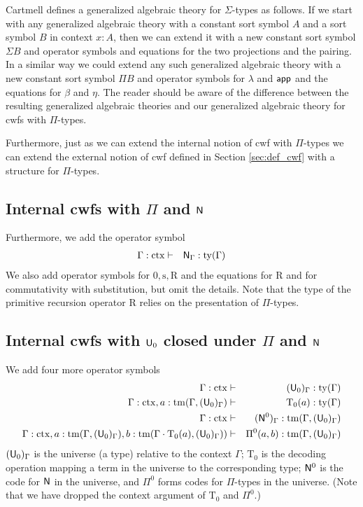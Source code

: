 \documentclass{lmcs}
\newcommand{\FYI}[1]{{\color{red}#1}}
\newcommand{\s}{\mathrm{s}}
\newcommand{\Rec}{\mathrm{R}}
\newcommand{\Ta}{\mathrm{T}}
\newcommand{\ctx}{\mathrm{ctx}}
\newcommand{\ty}{\mathrm{ty}}
\newcommand{\tm}{\mathrm{tm}}
\begin{document}
\begin{remark}
Cartmell \cite{cartmell:apal} defines a generalized algebraic theory for $\Sigma$-types as follows. If we start with any generalized algebraic theory with a constant sort symbol $A$ and  a sort symbol $B$ in context $x:A$, then we can extend it with a new constant sort symbol $\Sigma B$ and operator symbols and equations for the two projections and the pairing. In a similar way we could extend any such generalized algebraic theory with a new constant sort symbol $\Pi B$ and operator symbols for $\lambda$ and $\mathsf{app}$ and the equations for $\beta$ and $\eta$. The reader should be aware of the difference between the resulting generalized algebraic theories and our generalized algebraic theory for cwfs with $\Pi$-types.

Furthermore, just as we can extend the internal notion of cwf with $\Pi$-types we can extend the external notion of cwf defined in Section \ref{sec:def_cwf} with a structure for $\Pi$-types.
\end{remark}

\subsection{Internal cwfs with $\Pi$ and $\mathsf{N}$}
Furthermore, we add the operator symbol
\begin{eqnarray*}
\Gamma : \ctx &\vdash& \N_\Gamma : \ty(\Gamma)
\end{eqnarray*}
We also add operator symbols for $0, \s, \Rec$ and the equations for $\Rec$ and for commutativity with substitution, but omit the details. Note that the type of the primitive recursion operator $\Rec$ relies on the \FYI{presentation of} $\Pi$-types.

\subsection{Internal cwfs with $\mathsf{U}_0$ closed under $\Pi$ and $\mathsf{N}$}\label{sec:u-example}
We add four more operator symbols
\begin{eqnarray*}
\Gamma : \ctx &\vdash& (\U_0)_\Gamma : \ty(\Gamma)\\
\Gamma : \ctx, a : \tm(\Gamma,(\U_0)_\Gamma) &\vdash& {\Ta_0}(a) : \ty(\Gamma)\\
\Gamma : \ctx &\vdash& (\N^0)_\Gamma : \tm(\Gamma,(\U_0)_\Gamma) \\
\Gamma : \ctx,
a : \tm(\Gamma,(\U_0)_\Gamma),
b :  \tm(\Gamma \cdot \Ta_0(a), (\U_0)_\Gamma))
&\vdash&
 \Pi^0(a,b) : \tm(\Gamma,(\U_0)_\Gamma)
\end{eqnarray*}
$(\mathsf{U}_0)_\Gamma$ is the universe (a type) relative to the context $\Gamma$; $\Ta_0$ is the decoding operation mapping a term in the universe to the corresponding type; $\mathsf{N}^0$ is the code for $\mathsf{N}$ in the universe, and $\Pi^0$ forms codes for $\Pi$-types in the
 universe. (Note that we have dropped the context argument of $\Ta_0$ and $\Pi^0$.)
\end{document}
